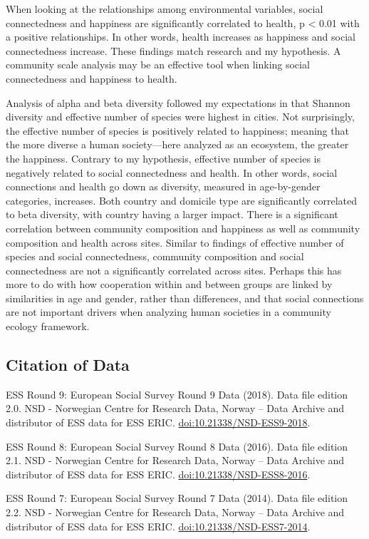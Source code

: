 When looking at the relationships among environmental variables, social
connectedness and happiness are significantly correlated to health, p
\textless{} 0.01 with a positive relationships. In other words, health
increases as happiness and social connectedness increase. These findings
match research and my hypothesis. A community scale analysis may be an
effective tool when linking social connectedness and happiness to
health.

Analysis of alpha and beta diversity followed my expectations in that
Shannon diversity and effective number of species were highest in
cities. Not surprisingly, the effective number of species is positively
related to happiness; meaning that the more diverse a human
society---here analyzed as an ecosystem, the greater the happiness.
Contrary to my hypothesis, effective number of species is negatively
related to social connectedness and health. In other words, social
connections and health go down as diversity, measured in age-by-gender
categories, increases. Both country and domicile type are significantly
correlated to beta diversity, with country having a larger impact. There
is a significant correlation between community composition and happiness
as well as community composition and health across sites. Similar to
findings of effective number of species and social connectedness,
community composition and social connectedness are not a significantly
correlated across sites. Perhaps this has more to do with how
cooperation within and between groups are linked by similarities in age
and gender, rather than differences, and that social connections are not
important drivers when analyzing human societies in a community ecology
framework.

\hypertarget{citation-of-data}{%
\subsection{Citation of Data}\label{citation-of-data}}

ESS Round 9: European Social Survey Round 9 Data (2018). Data file
edition 2.0. NSD - Norwegian Centre for Research Data, Norway -- Data
Archive and distributor of ESS data for ESS ERIC.
\url{doi:10.21338/NSD-ESS9-2018}.

ESS Round 8: European Social Survey Round 8 Data (2016). Data file
edition 2.1. NSD - Norwegian Centre for Research Data, Norway -- Data
Archive and distributor of ESS data for ESS ERIC.
\url{doi:10.21338/NSD-ESS8-2016}.

ESS Round 7: European Social Survey Round 7 Data (2014). Data file
edition 2.2. NSD - Norwegian Centre for Research Data, Norway -- Data
Archive and distributor of ESS data for ESS ERIC.
\url{doi:10.21338/NSD-ESS7-2014}.

